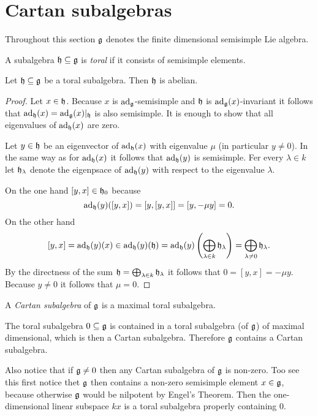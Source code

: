 \section{Cartan subalgebras}
Throughout this section $\mathfrak{g}$ denotes the finite dimensional semisimple Lie algebra.


\begin{defi}
 A subalgebra $\mathfrak{h} \subseteq \mathfrak{g}$ is \emph{toral} if it consists of semisimple elements.
\end{defi}


\begin{lem}
 Let $\mathfrak{h} \subseteq \mathfrak{g}$ be a toral subalgebra. Then $\mathfrak{h}$ is abelian.
\end{lem}
\begin{proof}
 Let $x \in \mathfrak{h}$. Because $x$ is $\operatorname{ad}_{\mathfrak{g}}$-semisimple and $\mathfrak{h}$ is $\operatorname{ad}_{\mathfrak{g}}(x)$-invariant it follows that $\operatorname{ad}_{\mathfrak{h}}(x) = \operatorname{ad}_{\mathfrak{g}}(x)|_{\mathfrak{h}}$ is also semisimple. It is enough to show that all eigenvalues of $\operatorname{ad}_{\mathfrak{h}}(x)$ are zero.
 
 Let $y \in \mathfrak{h}$ be an eigenvector of $\operatorname{ad}_{\mathfrak{h}}(x)$ with eigenvalue $\mu$ (in particular $y \neq 0$). In the same way as for $\operatorname{ad}_{\mathfrak{h}}(x)$ it follows that $\operatorname{ad}_{\mathfrak{h}}(y)$ is semisimple. Fer every $\lambda \in k$ let $\mathfrak{h}_\lambda$ denote the eigenpsace of $\operatorname{ad}_{\mathfrak{h}}(y)$ with respect to the eigenvalue $\lambda$.
 
  On the one hand $[y,x] \in \mathfrak{h}_0$ because
 \[
  \operatorname{ad}_{\mathfrak{h}}(y)([y,x])
  = [y,[y,x]]
  = [y, -\mu y]
  = 0.
 \]
 On the other hand
 \[
  [y,x]
  = \operatorname{ad}_{\mathfrak{h}}(y)(x)
  \in \operatorname{ad}_{\mathfrak{h}}(y)(\mathfrak{h})
  = \operatorname{ad}_{\mathfrak{h}}(y)\left( \bigoplus_{\lambda \in k} \mathfrak{h}_\lambda \right)
  = \bigoplus_{\lambda \neq 0} \mathfrak{h}_\lambda.
 \]
 By the directness of the sum $\mathfrak{h} = \bigoplus_{\lambda \in k} \mathfrak{h}_\lambda$ it follows that $0 = [y,x] = -\mu y$. Because $y \neq 0$ it follows that $\mu = 0$.
\end{proof}


\begin{defi}
 A \emph{Cartan subalgebra} of $\mathfrak{g}$ is a maximal toral subalgebra.
\end{defi}


\begin{rem}
 The toral subalgebra $0 \subseteq \mathfrak{g}$ is contained in a toral subalgebra (of $\mathfrak{g}$) of maximal dimensional, which is then a Cartan subalgebra. Therefore $\mathfrak{g}$ contains a Cartan subalgebra.
 
 Also notice that if $\mathfrak{g} \neq 0$ then any Cartan subalgebra of $\mathfrak{g}$ is non-zero. Too see this first notice thet $\mathfrak{g}$ then contains a non-zero semisimple element $x \in \mathfrak{g}$, because otherwise $\mathfrak{g}$ would be nilpotent by Engel’s Theorem. Then the one-dimensional linear subspace $kx$ is a toral subalgebra properly containing $0$.
\end{rem}


